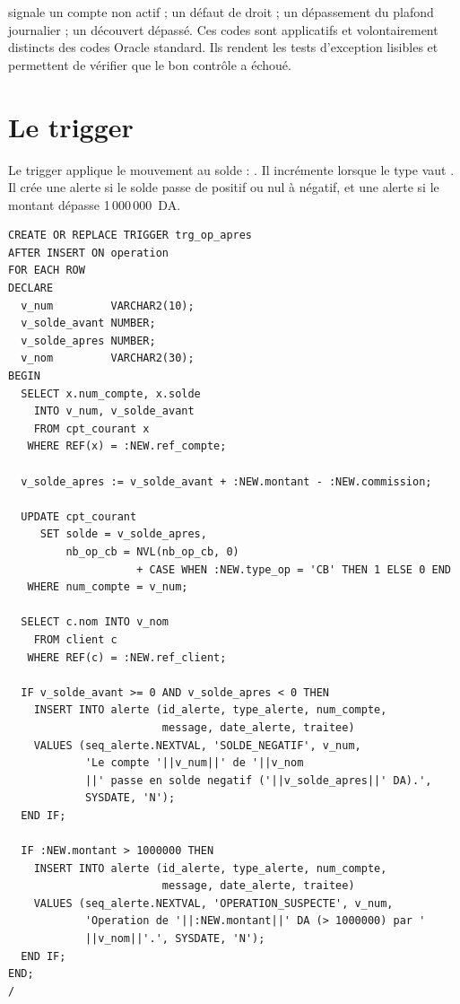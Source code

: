 \begin{clebox}
 signale un compte non actif ;  un défaut de
droit ;  un dépassement du plafond journalier ; 
un découvert dépassé. Ces codes sont applicatifs et volontairement distincts
des codes Oracle standard. Ils rendent les tests d'exception lisibles et
permettent de vérifier que le bon contrôle a échoué.
\end{clebox}

\section{Le trigger }

Le trigger  applique le mouvement au solde :
. Il incrémente 
lorsque le type vaut . Il crée une alerte  si le
solde passe de positif ou nul à négatif, et une alerte
 si le montant dépasse 1\,000\,000~DA.

\begin{lstlisting}[caption={Trigger \code{AFTER INSERT} : solde, compteur CB et alertes.},label={lst:trg-apres}]
CREATE OR REPLACE TRIGGER trg_op_apres
AFTER INSERT ON operation
FOR EACH ROW
DECLARE
  v_num         VARCHAR2(10);
  v_solde_avant NUMBER;
  v_solde_apres NUMBER;
  v_nom         VARCHAR2(30);
BEGIN
  SELECT x.num_compte, x.solde
    INTO v_num, v_solde_avant
    FROM cpt_courant x
   WHERE REF(x) = :NEW.ref_compte;

  v_solde_apres := v_solde_avant + :NEW.montant - :NEW.commission;

  UPDATE cpt_courant
     SET solde = v_solde_apres,
         nb_op_cb = NVL(nb_op_cb, 0)
                    + CASE WHEN :NEW.type_op = 'CB' THEN 1 ELSE 0 END
   WHERE num_compte = v_num;

  SELECT c.nom INTO v_nom
    FROM client c
   WHERE REF(c) = :NEW.ref_client;

  IF v_solde_avant >= 0 AND v_solde_apres < 0 THEN
    INSERT INTO alerte (id_alerte, type_alerte, num_compte,
                        message, date_alerte, traitee)
    VALUES (seq_alerte.NEXTVAL, 'SOLDE_NEGATIF', v_num,
            'Le compte '||v_num||' de '||v_nom
            ||' passe en solde negatif ('||v_solde_apres||' DA).',
            SYSDATE, 'N');
  END IF;

  IF :NEW.montant > 1000000 THEN
    INSERT INTO alerte (id_alerte, type_alerte, num_compte,
                        message, date_alerte, traitee)
    VALUES (seq_alerte.NEXTVAL, 'OPERATION_SUSPECTE', v_num,
            'Operation de '||:NEW.montant||' DA (> 1000000) par '
            ||v_nom||'.', SYSDATE, 'N');
  END IF;
END;
/
\end{lstlisting}


